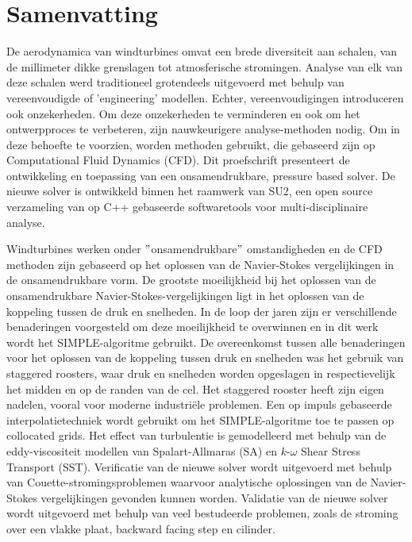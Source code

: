 \chapter*{Samenvatting}

{
De aerodynamica van windturbines omvat een brede diversiteit aan schalen, van de millimeter dikke grenslagen tot atmosferische stromingen. Analyse van elk van deze schalen werd traditioneel grotendeels uitgevoerd met behulp van vereenvoudigde of 'engineering' modellen. Echter, vereenvoudigingen introduceren ook onzekerheden. Om deze onzekerheden te verminderen en ook om het ontwerpproces te verbeteren, zijn nauwkeurigere analyse-methoden nodig. Om in deze behoefte te voorzien, worden methoden gebruikt, die gebaseerd zijn op Computational Fluid Dynamics (CFD). Dit proefschrift presenteert de ontwikkeling en toepassing van een onsamendrukbare, pressure based solver. De nieuwe solver is ontwikkeld binnen het raamwerk van SU2, een open source verzameling van op C++ gebaseerde softwaretools voor multi-disciplinaire analyse.

Windturbines werken onder $"$onsamendrukbare$"$ omstandigheden en de CFD methoden zijn gebaseerd op het oplossen van de Navier-Stokes vergelijkingen in de onsamendrukbare vorm. De grootste moeilijkheid bij het oplossen van de onsamendrukbare Navier-Stokes-vergelijkingen ligt in het oplossen van de koppeling tussen de druk en snelheden. In de loop der jaren zijn er verschillende benaderingen voorgesteld om deze moeilijkheid te overwinnen en in dit werk wordt het SIMPLE-algoritme gebruikt. De overeenkomst tussen alle benaderingen voor het oplossen van de koppeling tussen druk en snelheden was het gebruik van staggered roosters, waar druk en snelheden worden opgeslagen in respectievelijk het midden en op de randen van de cel. Het staggered rooster heeft zijn eigen nadelen, vooral voor moderne industri\"ele problemen. Een op impuls gebaseerde interpolatietechniek wordt gebruikt om het SIMPLE-algoritme toe te passen op collocated grids. Het effect van turbulentie is gemodelleerd met behulp van de eddy-viscositeit modellen van Spalart-Allmaras (SA) en $k$-$\omega$ Shear Stress Transport (SST). Verificatie van de nieuwe solver wordt uitgevoerd met behulp van Couette-stromingsproblemen waarvoor analytische oplossingen van de Navier-Stokes vergelijkingen gevonden kunnen worden. Validatie van de nieuwe solver wordt uitgevoerd met behulp van veel bestudeerde problemen, zoals de stroming over een vlakke plaat, backward facing step en cilinder.

}
